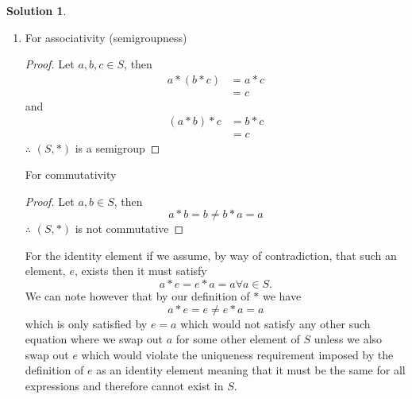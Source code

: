 \documentclass[10pt]{article}
\theoremstyle{definition}
\newtheorem{soln}{Solution}
\newcommand{\justif}[2]{&{#1}&\text{#2}}
\begin{document}
\begin{soln}
\begin{enumerate}[label=(\alph*)]
\begin{proof}
\begin{align*}
              a*b & = \frac{ab}{a+b}                                                                         \\
                  & = \frac{ba}{b+a}\justif{\quad}{Commutativity of $+$ and $\cdot$ on $\mathbb{Q}^{\geq0}$} \\                                                                     \\
                  & = b*a \justif{\quad}{Definition of $*$ in reverse}
            \end{align*}
            $\therefore$ $(S, *)$ is commutative\qedhere
          \end{proof}
          \newpage
    \item For associativity (semigroupness)
          \begin{proof}
            Let $a,b,c\in S$, then
            \begin{align*}
              a*(b*c) & = a*c \\
                      & = c
            \end{align*}
            and
            \begin{align*}
              (a*b)*c & = b*c \\
                      & = c
            \end{align*}
            $\therefore$ $(S, *)$ is a semigroup\qedhere
          \end{proof}
          For commutativity
          \begin{proof}
            Let $a,b\in S$, then
            $$a*b=b\neq b*a=a$$
            $\therefore$ $(S, *)$ is not commutative\qedhere
          \end{proof}
          For the identity element if we assume, by way of contradiction, that such an
          element, $e$, exists then it must satisfy
          $$a*e=e*a=a\forall a\in S.$$
          We can note however that by our definition of $*$ we have
          $$a*e=e\neq e*a=a$$
          which is only satisfied by $e=a$ which would not satisfy any other such equation
          where we swap out $a$ for some other element of $S$ unless we also swap out $e$
          which would violate the uniqueness requirement imposed by the definition of $e$ as
          an identity element meaning that it must be the same for all expressions and therefore
          cannot exist in $S$.
  \end{enumerate}
\end{soln}
\end{document}
